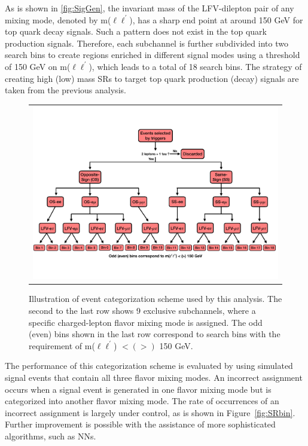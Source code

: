 As is shown in \ref{fig:SigGen}, the invariant mass of the LFV-dilepton pair of any mixing mode, denoted by m($\ell\ell^{\prime}$), has a sharp end point at around 150 GeV for top quark decay signals. Such a pattern does not exist in the top quark production signals. Therefore, each subchannel is further subdivided into two search bins to create regions enriched in different signal modes using a threshold of 150 GeV on m($\ell\ell^{\prime}$), which leads to a total of 18 search bins. The strategy of creating high (low) mass \acp{SR} to target top quark production (decay) signals are taken from the previous analysis.

\begin{figure}[tbh!]
 \begin{center}
 \begin{tabular}{c}
 \includegraphics[width=\textwidth]{figures/Part4/Evt/SRFlowChart}
 \end{tabular}
 \caption{Illustration of event categorization scheme used by this analysis. The second to the last row shows 9 exclusive subchannels, where a specific charged-lepton flavor mixing mode is assigned. The odd (even) bins shown in the last row correspond to search bins with the requirement of m($\ell\ell^{\prime}$) $<(>)$ 150 GeV.}
 \label{fig:EvtCat}
 \end{center}
 \end{figure}
 
The performance of this categorization scheme is evaluated by using simulated signal events that contain all three flavor mixing modes. An incorrect assignment occurs when a signal event is generated in one flavor mixing mode but is categorized into another flavor mixing mode. The rate of occurrences of an incorrect assignment is largely under control, as is shown in Figure~\ref{fig:SRbin}. Further improvement is possible with the assistance of more sophisticated algorithms, such as \acp{NN}. 
 
